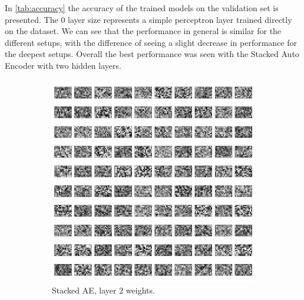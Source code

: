 \documentclass{article}
\begin{document}
In \cref{tab:accuracy} the accuracy of the trained models on the validation set is presented.
The 0 layer size represents a simple perceptron layer trained directly on the dataset.
We can see that the performance in general is similar for the different setups,
with the difference of seeing a slight decrease in performance for the deepest setups.
Overall the best performance was seen with the Stacked Auto Encoder with two hidden layers.

\begin{figure}[!ht]
  \centering
  \begin{subfigure}[t]{0.47\textwidth}
    \centering
    \includegraphics[width=\textwidth]{../plots/3_2_1/sae_2l.png}
    \caption{Stacked AE, layer 2 weights.}
    \label{fig:w50ae}
  \end{subfigure}
  ~
  \addtocounter{subfigure}{1}
  \begin{subfigure}[t]{0.47\textwidth}
    \centering

\end{subfigure}
\end{figure}
\end{document}
